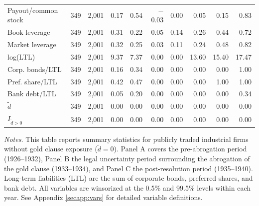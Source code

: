 \begin{table}[p]
\begin{threeparttable}
\begin{tabular}{lrrrrrrrrr}
            Payout/common stock & 349 & 2,001 & 0.17 & 0.54 & $-$0.03 & 0.00 & 0.05 & 0.15 & 0.83 \\
            Book leverage & 349 & 2,001 & 0.31 & 0.22 & 0.05 & 0.14 & 0.26 & 0.44 & 0.72 \\
            Market leverage & 349 & 2,001 & 0.32 & 0.25 & 0.03 & 0.11 & 0.24 & 0.48 & 0.82 \\
            log(LTL) & 349 & 2,001 & 9.37 & 7.37 & 0.00 & 0.00 & 13.60 & 15.40 & 17.47 \\
            Corp. bonds/LTL & 349 & 2,001 & 0.16 & 0.34 & 0.00 & 0.00 & 0.00 & 0.00 & 1.00 \\
            Pref. share/LTL & 349 & 2,001 & 0.42 & 0.47 & 0.00 & 0.00 & 0.00 & 1.00 & 1.00 \\
            Bank debt/LTL & 349 & 2,001 & 0.05 & 0.20 & 0.00 & 0.00 & 0.00 & 0.00 & 0.34 \\
            \ensuremath{\tilde{d}} & 349 & 2,001 & 0.00 & 0.00 & 0.00 & 0.00 & 0.00 & 0.00 & 0.00 \\
            \ensuremath{I_{\tilde{d}>0}} & 349 & 2,001 & 0.00 & 0.00 & 0.00 & 0.00 & 0.00 & 0.00 & 0.00 \\
            \bottomrule
        \end{tabular}
    \end{threeparttable}

    \vspace*{3mm} \justifying \noindent
\scriptsize{\textit{Notes.} This table reports summary statistics for publicly traded industrial firms without gold clause exposure ($\tilde{d} = 0$). Panel A covers the pre-abrogation period (1926--1932), Panel B the legal uncertainty period surrounding the abrogation of the gold clause (1933--1934), and Panel C the post-resolution period (1935--1940). Long-term liabilities (LTL) are the sum of corporate bonds, preferred shares, and bank debt. All variables are winsorized at the 0.5\% and 99.5\% levels within each year. See Appendix \ref{secapp:vars} for detailed variable definitions.}
\end{table}